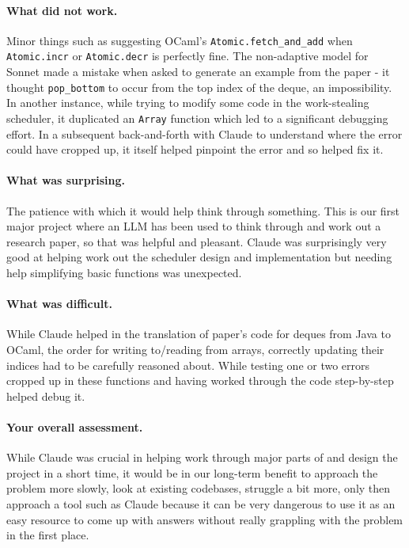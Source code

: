 \documentclass[11pt,a4paper]{article}
\begin{document}
\paragraph{What did not work.}
Minor things such as suggesting OCaml's \texttt{Atomic.fetch\_and\_add} when
\texttt{Atomic.incr} or \texttt{Atomic.decr} is perfectly fine.
The non-adaptive model for Sonnet made a mistake when asked to generate an example
from the paper - it thought \texttt{pop\_bottom} to occur from the top index
of the deque, an impossibility. In another instance, while trying to modify some code in the
work-stealing scheduler, it duplicated an \texttt{Array} function which led to a
significant debugging effort. In a subsequent back-and-forth with Claude to
understand where the error could have cropped up, it itself helped pinpoint the
error and so helped fix it.

\paragraph{What was surprising.}
The patience with which it would help think through something. This is our first
major project where an LLM has been used to think through and work out a
research paper, so that was helpful and pleasant. Claude was
surprisingly very good at helping work out the scheduler design and
implementation but needing help simplifying basic functions was unexpected.

\paragraph{What was difficult.}
While Claude helped in the translation of paper's code for deques from Java to
OCaml, the order for writing to/reading from arrays, correctly updating their
indices had to be carefully reasoned about. While testing one or two errors
cropped up in these functions and having worked through the code step-by-step
helped debug it.

\paragraph{Your overall assessment.}
While Claude was crucial in helping work through major parts of and design the
project in a short time, it would be in our long-term benefit to approach the
problem more slowly, look at existing codebases, struggle a bit more, only then
approach a tool such as Claude because it can be very dangerous to use it as an
easy resource to come up with answers without really grappling with the problem
in the first place.
\end{document}
